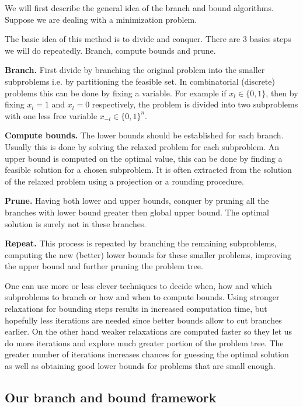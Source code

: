 \documentclass[12pt]{book}
\theoremstyle{definition}
\begin{document}
We will first describe the general idea of the branch and bound algorithms.  Suppose we are dealing with a minimization problem.

The basic idea of this method is to divide and conquer. There are 3 basics steps we will do repeatedly. Branch, compute bounds and prune.

\textbf{Branch.} First divide by branching the original problem into the smaller subproblems i.e. by partitioning the feasible set. 
 In combinatorial (discrete) problems this can be done by fixing a variable. For example if $x_l \in \{0,1\}$, then by fixing $x_l=1$ and $x_l=0$ respectively, the problem is divided into two subproblems with one less free variable $x_{-l} \in \{0,1\}^n.$


\textbf{Compute bounds.} The lower bounds should be established for each branch. Usually this is done by solving the relaxed problem for each subproblem. 
An upper bound is computed on the optimal value, this can be done by finding a feasible solution for a chosen subproblem. It is often extracted from the solution of the relaxed problem using a projection or a rounding procedure.

\textbf{Prune.} Having both lower and upper bounds, conquer by pruning all the branches with lower bound greater then global upper bound. The optimal solution is surely not in these branches.

\textbf{Repeat.} This process is repeated by branching the remaining subproblems, computing the new (better) lower bounds for these smaller problems, improving the upper bound and further pruning the problem tree.

One can use more or less clever techniques to decide when, how and which subproblems to branch or how and when to compute bounds.
Using stronger relaxations for bounding steps results in increased computation time, but hopefully less iterations are needed since better bounds allow to cut branches earlier.  On the other hand weaker relaxations are computed faster so they let us do more iterations and explore much greater portion of the problem tree. The greater number of iterations increases chances for guessing the optimal solution as well as obtaining good lower bounds for problems that are small enough.

\subsection{Our branch and bound framework}
\end{document}
